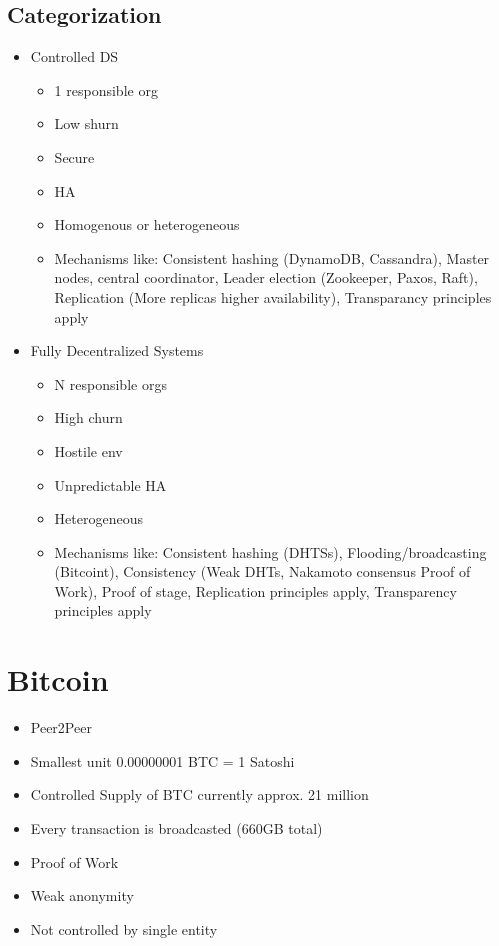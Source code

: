 \documentclass[../Main.tex]{subfiles}
\begin{document}
\subsection{Categorization}
\begin{itemize}
    \item Controlled DS
          \begin{itemize}
              \item 1 responsible org
              \item Low shurn
              \item Secure
              \item HA
              \item Homogenous or heterogeneous
              \item Mechanisms like:
                    Consistent hashing (DynamoDB, Cassandra), Master nodes, central coordinator,
                    Leader election (Zookeeper, Paxos, Raft), Replication (More replicas higher availability),
                    Transparancy principles apply
          \end{itemize}
    \item Fully Decentralized Systems
          \begin{itemize}
              \item N responsible orgs
              \item High churn
              \item Hostile env
              \item Unpredictable HA
              \item Heterogeneous
              \item Mechanisms like:
                    Consistent hashing (DHTSs), Flooding/broadcasting (Bitcoint),
                    Consistency (Weak DHTs, Nakamoto consensus Proof of Work), Proof of stage,
                    Replication principles apply, Transparency principles apply
          \end{itemize}
\end{itemize}

\section{Bitcoin}
\begin{itemize}
    \item Peer2Peer
    \item Smallest unit 0.00000001 BTC = 1 Satoshi
    \item Controlled Supply of BTC currently approx. 21 million
    \item Every transaction is broadcasted (660GB total)
    \item Proof of Work
    \item Weak anonymity
    \item Not controlled by single entity
\end{itemize}
\end{document}
